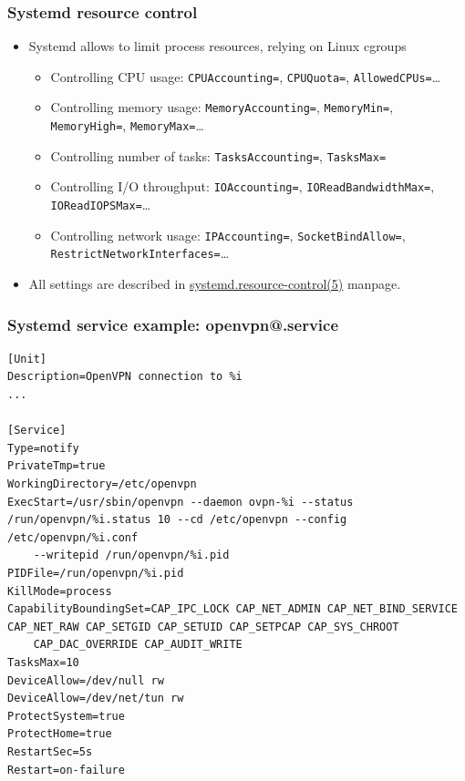 \begin{frame}
	\frametitle{Systemd resource control}
	\begin{itemize}
		\item Systemd allows to limit process resources, relying on Linux cgroups
			\begin{itemize}
				\item Controlling CPU usage: \texttt{CPUAccounting=},
					\texttt{CPUQuota=}, \texttt{AllowedCPUs=}\ldots
				\item Controlling memory usage: \texttt{MemoryAccounting=},
					\texttt{MemoryMin=}, \texttt{MemoryHigh=}, \texttt{MemoryMax=}\ldots
				\item Controlling number of tasks: \texttt{TasksAccounting=},
					\texttt{TasksMax=}
				\item Controlling I/O throughput: \texttt{IOAccounting=},
					\texttt{IOReadBandwidthMax=}, \texttt{IOReadIOPSMax=}\ldots
				\item Controlling network usage: \texttt{IPAccounting=},
					\texttt{SocketBindAllow=}, \texttt{RestrictNetworkInterfaces=}\ldots
			\end{itemize}
		\item All settings are described in
			\href{https://manned.org/systemd.resource-control.5}{systemd.resource-control(5)}
			manpage.
	\end{itemize}
\end{frame}

\begin{frame}[fragile]
	\frametitle{Systemd service example: openvpn@.service}
	\begin{block}{}
		{\tiny
		\begin{verbatim}
[Unit]
Description=OpenVPN connection to %i
...

[Service]
Type=notify
PrivateTmp=true
WorkingDirectory=/etc/openvpn
ExecStart=/usr/sbin/openvpn --daemon ovpn-%i --status /run/openvpn/%i.status 10 --cd /etc/openvpn --config /etc/openvpn/%i.conf
    --writepid /run/openvpn/%i.pid
PIDFile=/run/openvpn/%i.pid
KillMode=process
CapabilityBoundingSet=CAP_IPC_LOCK CAP_NET_ADMIN CAP_NET_BIND_SERVICE CAP_NET_RAW CAP_SETGID CAP_SETUID CAP_SETPCAP CAP_SYS_CHROOT
    CAP_DAC_OVERRIDE CAP_AUDIT_WRITE
TasksMax=10
DeviceAllow=/dev/null rw
DeviceAllow=/dev/net/tun rw
ProtectSystem=true
ProtectHome=true
RestartSec=5s
Restart=on-failure
\end{verbatim}
		}
	\end{block}
\end{frame}

